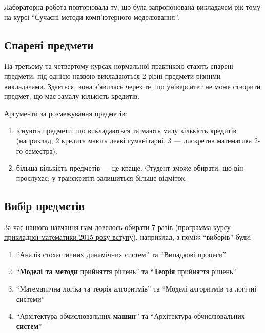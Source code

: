 \documentclass[14pt, a4paper]{extarticle}  %
\begin{document}
Лабораторна робота повторювала ту, що була запропонована викладачем рік тому на курсі ``Сучасні методи комп'ютерного моделювання''. 

\subsection{Спарені предмети}
\label{conjunctions}
На третьому та четвертому курсах нормальної практикою стають спарені предмети: під однією назвою викладаються 2 різні предмети різними викладачами. Здається, вона з'явилась через те, що університет не може створити предмет, що має замалу кількість кредитів. 

Аргументи за розмежування предметів:
\begin{enumerate}
    \item існують предмети, що викладаються та мають малу кількість кредитів (наприклад, 2 кредита мають деякі гуманітарні, 3 --- дискретна математика 2-го семестра). 
    \item більша кількість предметів --- це краще. Cтудент зможе обирати, що він прослухає; у транскрипті залишиться більше відміток.
\end{enumerate}

\subsection{Вибір предметів}
\label{real_choice}
За час нашого навчання нам довелось обирати 7 разів (\href{http://csc.knu.ua/media/filer_public/3b/e7/3be7da3c-5fc4-454e-b316-c55718de0d42/b6_040301_pm_2015.pdf}{программа курсу прикладної математики 2015 року вступу}), наприклад, з-поміж ``виборів'' були: %
\begin{enumerate}
    \item ``Аналіз стохастичних динамічних систем'' та ``Випадкові процеси''
    \item ``\textbf{Моделі та методи} прийняття рішень'' та ``\textbf{Теорія} прийняття рішень''
    \item  ``Математична логіка та теорія алгоритмів'' та ``Моделі алгоритмів та логічні системи''
    \item ``Архітектура обчислювальних \textbf{машин}'' та ``Архітектура обчислювальних \textbf{систем}''
\end{enumerate}
\end{document}

